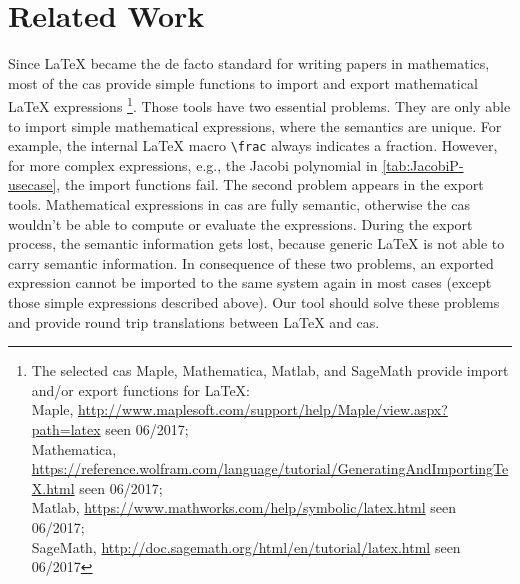 \section{Related Work}\label{sec:related-work}
Since \LaTeX{} became the de facto standard for writing papers in mathematics, most of the \gls*{cas} provide simple functions to import and export mathematical \LaTeX{} expressions%
\footnote{The selected \gls*{cas} Maple, Mathematica, Matlab, and SageMath provide import and/or export functions for \LaTeX:\\
Maple, \url{http://www.maplesoft.com/support/help/Maple/view.aspx?path=latex} seen 06/2017;\\
Mathematica, \url{https://reference.wolfram.com/language/tutorial/GeneratingAndImportingTeX.html} seen 06/2017;\\
Matlab, \url{https://www.mathworks.com/help/symbolic/latex.html} seen 06/2017;\\
SageMath, \url{http://doc.sagemath.org/html/en/tutorial/latex.html} seen 06/2017}. %
Those tools have two essential problems. They are only able to import simple mathematical expressions, where the semantics are unique. For example, the internal \LaTeX{} macro \verb|\frac| always indicates a fraction. However, for more complex expressions, e.g., the Jacobi polynomial in \cref{tab:JacobiP-usecase}, the import functions fail. The second problem appears in the export tools. Mathematical expressions in \gls*{cas} are fully semantic, otherwise the \gls*{cas} wouldn't be able to compute or evaluate the expressions. During the export process, the semantic information gets lost, because generic \LaTeX{} is not able to carry semantic information. In consequence of these two problems, an exported expression cannot be imported to the same system again in most cases (except those simple expressions described above). Our tool should solve these problems and provide round trip translations between \LaTeX{} and \gls*{cas}.

